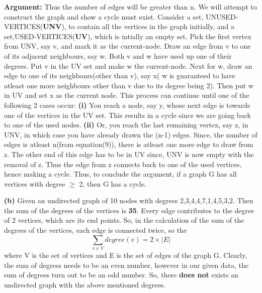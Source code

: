 \documentclass{article}
\renewcommand\part[1]{\vspace{.10in}\textbf{(#1)}}
\begin{document}
\textbf {Argument:} Thus the number of edges will be greater than n. We will attempt to construct the graph and show a cycle must exist. Consider a set, UNUSED-VERTICES(\textbf {UNV}), to contain all the vertices in the graph initially, and a set,USED-VERTICES(\textbf {UV}), which is intially an empty set. Pick the first vertex from UNV, say v, and mark it as the current-node. Draw an edge from v to one of its adjacent neighbours, say w. Both v and w have used up one of their degrees. Put v in the UV set and make w the current-node. Next for w, draw an edge to one of its neighbours(other than v), say x( w is guaranteed to have atleast one more neighbours other than v due to its degree being 2). Then put w in UV and set x as the current node. This process can continue until one of the following 2 cases occur: \newline
\hspace*{0.5cm} \textbf {(i)} You reach a node, say y, whose next edge is towards one of the vertices in the UV set. This results in a cycle since we are going back to one of the used nodes. \newline
\hspace*{0.5cm} \textbf{(ii)} Or, you reach the last remaining vertex, say z, in UNV, in which case you have already drawn the (n-1) edges. Since, the number of edges is atleast n(from equation(9)), there is atleast one more edge to draw from z. The other end of this edge has to be in UV since, UNV is now empty with the removal of z. Thus the edge from z connects back to one of the used vertices, hence making a cycle. \newline
Thus, to conclude the argument, if a graph G has all vertices with degree $\geq$ 2, then G has a cycle. \newline

\part{b} Given an undirected graph of 10 nodes with degrees 2,3,4,4,7,1,4,5,3,2. Then the sum of the degrees of the vertices is \textbf {35}. Every edge contributes to the degree of 2 vertices, which are its end points. So, in the calculation of the sum of the degrees of the vertices, each edge is connected twice, so the 
\[ \sum_{v \in V}degree(v) = 2 \times |E| \]
where V is the set of vertices and E is the set of edges of the graph G. Clearly, the sum of degrees needs to be an even number, however in our given data, the sum of degrees turn out to be an odd number. So, there \textbf {does not} exists an undirected graph with the above mentioned degrees. \newline
\end{document}
